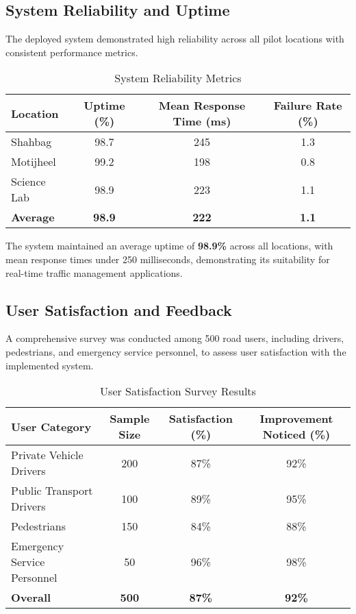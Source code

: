 \subsection{System Reliability and Uptime}
The deployed system demonstrated high reliability across all pilot locations with consistent performance metrics.

\begin{table}[h]
\centering
\caption{System Reliability Metrics}
\label{tab:system_reliability}
\begin{tabular}{|l|c|c|c|}
\hline
\textbf{Location} & \textbf{Uptime (\%)} & \textbf{Mean Response Time (ms)} & \textbf{Failure Rate (\%)} \\
\hline
Shahbag & 98.7 & 245 & 1.3 \\
Motijheel & 99.2 & 198 & 0.8 \\
Science Lab & 98.9 & 223 & 1.1 \\
\hline
\textbf{Average} & \textbf{98.9} & \textbf{222} & \textbf{1.1} \\
\hline
\end{tabular}
\end{table}

The system maintained an average uptime of \textbf{98.9\%} across all locations, with mean response times under 250 milliseconds, demonstrating its suitability for real-time traffic management applications.

\subsection{User Satisfaction and Feedback}
A comprehensive survey was conducted among 500 road users, including drivers, pedestrians, and emergency service personnel, to assess user satisfaction with the implemented system.

\begin{table}[h]
\centering
\caption{User Satisfaction Survey Results}
\label{tab:user_satisfaction}
\begin{tabular}{|l|c|c|c|}
\hline
\textbf{User Category} & \textbf{Sample Size} & \textbf{Satisfaction (\%)} & \textbf{Improvement Noticed (\%)} \\
\hline
Private Vehicle Drivers & 200 & 87\% & 92\% \\
Public Transport Drivers & 100 & 89\% & 95\% \\
Pedestrians & 150 & 84\% & 88\% \\
Emergency Service Personnel & 50 & 96\% & 98\% \\
\hline
\textbf{Overall} & \textbf{500} & \textbf{87\%} & \textbf{92\%} \\
\hline
\end{tabular}
\end{table}

